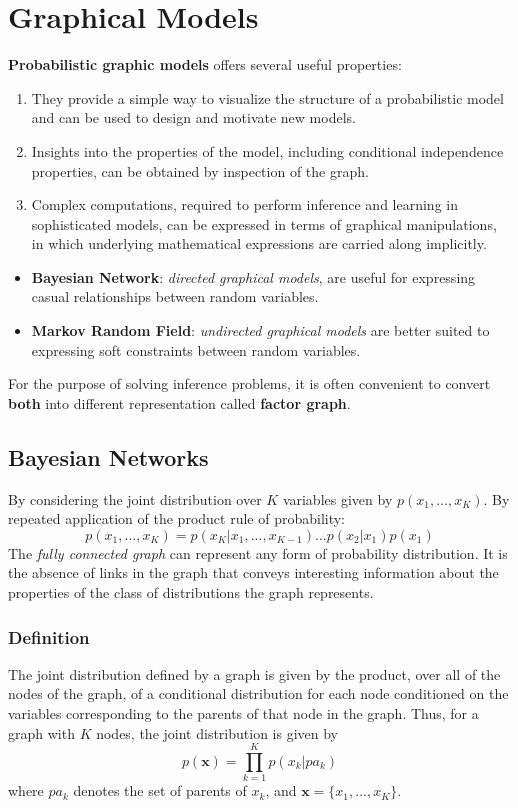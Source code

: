 \documentclass[a3paper, 12pt]{book} %
\begin{document}
\chapter{Graphical Models}
\textbf{Probabilistic graphic models} offers several useful properties:
\begin{enumerate}
	\item They provide a simple way to visualize the structure of a probabilistic model and can be used to design and motivate new models.
	\item Insights into the properties of the model, including conditional independence properties, can be obtained by inspection of the graph.
	\item Complex computations, required to perform inference and learning in sophisticated models, can be expressed in terms of graphical manipulations, in which underlying mathematical expressions are carried along implicitly.
\end{enumerate} 
\begin{itemize}
	\item \textbf{Bayesian Network}: \emph{directed graphical models}, are useful for expressing casual relationships between random variables.
	\item \textbf{Markov Random Field}: \emph{undirected graphical models} are better suited to expressing soft constraints between random variables.
\end{itemize}
For the purpose of solving inference problems, it is often convenient to convert \textbf{both} into different representation called \textbf{factor graph}.

\section{Bayesian Networks}
By considering the joint distribution over $K$ variables given by $p(x_1,...,x_K)$. By repeated application of the product rule of probability:
\begin{equation}
p(x_1,...,x_K)=p(x_K|x_1,...,x_{K-1})...p(x_2|x_1)p(x_1)
\end{equation}
The \emph{fully connected graph} can represent any form of probability distribution. It is the absence of links in the graph that conveys interesting information about the properties of the class of distributions the graph represents.

\subsection{Definition}
The joint distribution
defined by a graph is given by the product, over all of the nodes of the graph, of
a conditional distribution for each node conditioned on the variables corresponding
to the parents of that node in the graph. Thus, for a graph with $K$ nodes, the joint
distribution is given by 
\begin{equation}
p(\mathbf{x})=\prod_{k=1}^{K}{p(x_k|pa_k)}
\end{equation}
where $pa_k$ denotes the set of parents of $x_k$, and $\mathbf{x}=\{x_1,...,x_K\}$.
\end{document}

